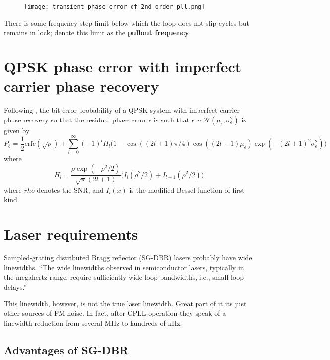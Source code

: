 \documentclass[a4paper]{article}
\begin{document}
\begin{figure}[h!]
	\centering
	\texttt{[image: transient\_phase\_error\_of\_2nd\_order\_pll.png]}
	\label{fig:transient_2nd_pll}
	\caption{\cite{Gardner}}
\end{figure}

There is some frequency-step limit below which the loop does not slip cycles but remains in lock; denote this limit as the \textbf{pullout frequency}


\section{QPSK phase error with imperfect carrier phase recovery}
Following \cite{Prabhu1976}, the bit error probability of a QPSK system with imperfect carrier phase recovery so that the residual phase error $\epsilon$ is such that $\epsilon \sim \mathcal{N}(\mu_\epsilon, \sigma_\epsilon^2)$ is given by
\begin{equation}
P_b = \frac{1}{2}\mathrm{erfc}(\sqrt{\rho}) + \sum_{l = 0}^\infty (-1)^lH_l\Big(1 - \cos((2l+1)\pi/4)\cos((2l+1)\mu_\epsilon)\exp(-(2l+1)^2\sigma_\epsilon^2)\Big)
\end{equation}
where
\begin{equation}
H_l = \frac{\rho\exp(-\rho^2/2)}{\sqrt{\pi}(2l+1)}\Big(I_l(\rho^2/2) + I_{l+1}(\rho^2/2)\Big)
\end{equation}
where $rho$ denotes the SNR, and $I_l(x)$ is the modified Bessel function of first kind.


\section{Laser requirements}

Sampled-grating distributed Bragg reflector (SG-DBR) lasers probably have wide linewidths.  ``The wide linewidths observed in semiconductor lasers, typically in the megahertz range, require sufficiently wide loop bandwidths, i.e., small loop delays.'' \cite{Ristic2010}

This linewidth, however, is not the true laser linewidth. Great part of it its just other sources of FM noise. In fact, after OPLL operation they speak of a linewidth reduction from several MHz to hundreds of kHz. 

\subsection{Advantages of SG-DBR}
\end{document}
